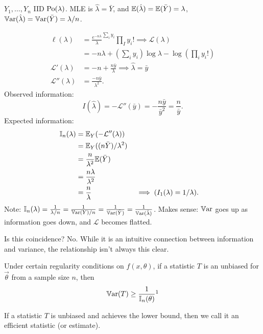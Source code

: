 \documentclass[10pt, a4paper]{article}
\begin{document}
\begin{example}
    $Y_1, \dotsc, Y_n$ IID $\operatorname{Po}(\lambda)$.
    MLE is $\hat{\lambda} = \bar{Y}$,
    and $\mathbb{E}(\hat{\lambda}) = \mathbb{E}(\bar{Y}) = \lambda$,
    $\mathbb{V}\mathrm{ar}(\hat{\lambda}) = \mathbb{V}\mathrm{ar}(\bar{Y}) = \lambda / n$.

    \begin{align*}
        \ell(\lambda) &= \frac{e ^ {-n\lambda}}\lambda ^ {\sum_{i}y_i}{\prod_{I}y_i!} \implies \mathcal{L}(\lambda) \\
        &= -n\lambda + \left(\sum_{i}y_i\right)\log\lambda - \log\left(\prod_{i}y_i!\right) \\
        \mathcal{L}'(\lambda) &= -n + \frac{n\bar{y}}{\lambda} \implies \hat{\lambda} = \bar{y} \\
        \mathcal{L}''(\lambda) &= \frac{-n\bar{y}}{\lambda ^ 2}.
    \end{align*}
    Observed information:
    \[
    I(\hat{\lambda}) = -\mathcal{L}''(\bar{y}) = -\frac{n\bar{y}}{\bar{y} ^ 2} = \frac{n}{\bar{y}}.
    \]
    Expected information:
    \begin{align*}
        \mathbb{I}_n(\lambda) &= \mathbb{E}_Y(-\mathcal{L}''(\lambda)) \\
        &= \mathbb{E}_Y((n\bar{Y}) / \lambda ^ 2) \\
        &= \frac{n}{\lambda ^ 2}\mathbb{E}(\bar{Y}) \\
        &= \frac{n\lambda}{\lambda ^ 2} \\
        &= \frac{n}{\lambda} &&\implies (I_1(\lambda) = 1 / \lambda).
    \end{align*}
    Note:
    $\mathbb{I}_n(\lambda) = \frac{1}{\lambda / n} = \frac{1}{\mathbb{V}\mathrm{ar}(Y) / n} = \frac{1}{\mathbb{V}\mathrm{ar}(\bar{Y})} = \frac{1}{\mathbb{V}\mathrm{ar}(\hat{\lambda})}$.
    Makes sense:
    $\mathbb{V}\mathrm{ar}$ goes up as information goes down,
    and $\mathcal{L}$ becomes flatted.
\end{example}

Is this coincidence?
No.
While it is an intuitive connection between information and variance,
the relationship isn't always this clear.

\begin{proposition}
    Under certain regularity conditions on $f(x, \theta)$,
    if a statistic $T$ is an unbiased for $\vec{\theta}$ from a sample size $n$,
    then
    \[
    \Var(T) \geq \frac{1}{\mathbb{I}_n(\vec{\theta})}\footnotemark
    \]
\end{proposition}

If a statistic $T$ is unbiased and achieves the lower bound,
then we call it an efficient statistic
(or estimate).
\end{document}
